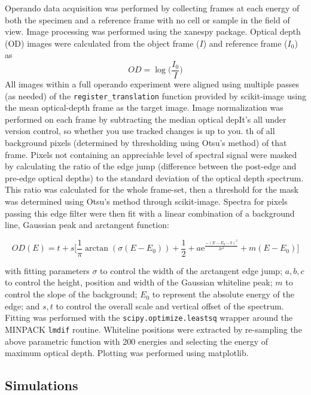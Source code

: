 \documentclass{article}
\begin{document}
Operando data acquisition was performed by collecting frames at each
energy of both the specimen and a reference frame with no cell or
sample in the field of view. Image processing was performed using the
xanespy package\cite{xanespy}. Optical depth (OD) images were
calculated from the object frame ($I$) and reference frame ($I_0$) as
$$OD = \log{\big(\frac{I_0}{I}\big)}$$ All images within a full
operando experiment were aligned using multiple passes (as needed) of
the \texttt{register\_translation} function provided by
scikit-image\cite{walt2014} using the mean optical-depth frame as the
target image. Image normalization was performed on each frame by
subtracting the median optical depIt's all under version control, so whether you use tracked changes is
up to you.
th of all background pixels
(determined by thresholding using Otsu's method\cite{otsu1979}) of
that frame\cite{jin2015}. Pixels not containing an appreciable level
of  spectral signal were masked by calculating the ratio of the
edge jump (difference between the post-edge and pre-edge optical
depths) to the standard deviation of the optical depth spectrum. This
ratio was calculated for the whole frame-set, then a threshold for the
mask was determined using Otsu's method\cite{otsu1979} through
scikit-image\cite{walt2014}. Spectra for pixels passing this edge
filter were then fit with a linear combination of a background line,
Gaussian peak and arctangent function:

\begin{equation}
  OD(E) = t + s\bigg[\frac{1}{\pi}\arctan(\sigma (E-E_0)) + \frac{1}{2} +
    a\mathrm{e}^{\frac{-(E-E_0-b)^2}{2c^2}} + m(E-E_0)\bigg]
  \label{eq:kedge-fitting}
\end{equation}

with fitting parameters $\sigma$ to control the width of the
arctangent edge jump; $a, b, c$ to control the height, position and
width of the Gaussian whiteline peak; $m$ to control the slope of the
background; $E_0$ to represent the absolute energy of the edge; and
$s, t$ to control the overall scale and vertical offset of the
spectrum. Fitting was performed with the
\texttt{scipy.optimize.leastsq} wrapper around the MINPACK
\texttt{lmdif} routine\cite{scipy}. Whiteline positions were extracted
by re-sampling the above parametric function with 200 energies and
selecting the energy of maximum optical depth. Plotting was performed
using matplotlib\cite{matplotlib}.

\subsection{Simulations}
\end{document}
